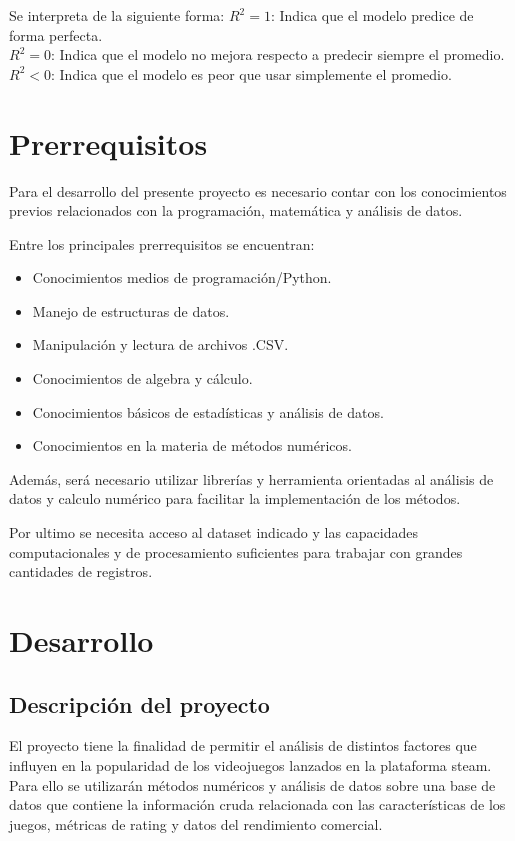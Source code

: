 \documentclass[12pt]{report}
\begin{document}
Se interpreta de la siguiente forma:
$R^2 = 1$: Indica que el modelo predice de forma perfecta.\\
$R^2 = 0$: Indica que el modelo no mejora respecto a predecir siempre el promedio.\\
$R^2 < 0$: Indica que el modelo es peor que usar simplemente el promedio.


\section*{Prerrequisitos}
Para el desarrollo del presente proyecto es necesario contar con los conocimientos previos relacionados con la programación, matemática y análisis de datos.

Entre los principales prerrequisitos se encuentran:
\begin{itemize}
    \item Conocimientos medios de programación/Python.
    \item Manejo de estructuras de datos.
    \item Manipulación y lectura de archivos .CSV.
    \item Conocimientos de algebra y cálculo.
    \item Conocimientos básicos de estadísticas y análisis de datos.
    \item Conocimientos en la materia de métodos numéricos.
\end{itemize}

Además, será necesario utilizar librerías y herramienta orientadas al análisis de datos y calculo numérico para facilitar la implementación de los métodos.

Por ultimo se necesita acceso al dataset indicado y las capacidades computacionales y de procesamiento suficientes para trabajar con grandes cantidades de registros.


\section*{Desarrollo}

\subsection*{Descripción del proyecto}
El proyecto tiene la finalidad de permitir el análisis de distintos factores que influyen en la popularidad de los videojuegos lanzados en la plataforma steam. Para ello se utilizarán métodos numéricos y análisis de datos sobre una base de datos que contiene la información cruda relacionada con las características de los juegos, métricas de rating y datos del rendimiento comercial.
\end{document}
